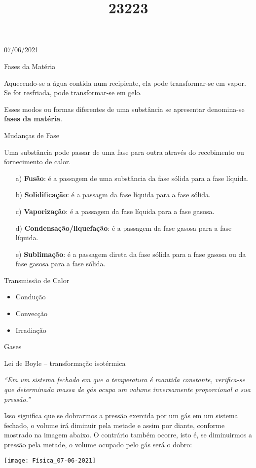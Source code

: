 \documentclass{SchoolBook}
\begin{document}
    \begin{day}{07/06/2021}
        \title{2}{Fases da Matéria}
        
        Aquecendo-se a água contida num recipiente, ela pode transformar-se em vapor. Se for resfriada, pode transformar-se em gelo.
        
        Esses modos ou formas diferentes de uma substância se apresentar denomina-se \textbf{fases da matéria}.
        
        \title{3}{Mudanças de Fase}
        
        Uma substância pode passar de uma fase para outra através do recebimento ou fornecimento de calor.
        
        \begin{enumerate}[nosep]
            \item[a)] \textbf{Fusão}: é a passagem de uma substância da fase sólida para a fase líquida.
            \item[b)] \textbf{Solidificação}: é a passagm da fase líquida para a fase sólida.
            \item[c)] \textbf{Vaporização}: é a passagem da fase líquida para a fase gasosa.
            \item[d)] \textbf{Condensação/liquefação}: é a passagem da fase gasosa para a fase líquida.
            \item[e)] \textbf{Sublimação}: é a passagem direta da fase sólida para a fase gasosa ou da fase gasosa para a fase sólida.
        \end{enumerate}
        
        \title{2}{Transmissão de Calor}
        
        \begin{itemize}[nosep]
            \item Condução
            \item Convecção
            \item Irradiação
        \end{itemize}
        
        \title{2}{Gases}
        
        \title{3}{Lei de Boyle -- transformação isotérmica}
        
	\begin{center}
        	\emph{“Em um sistema fechado em que a temperatura é mantida constante, verifica-se que determinada massa de gás ocupa um volume inversamente proporcional a sua pressão.”}
	\end{center}        

        Isso significa que se dobrarmos a pressão exercida por um gás em um sistema fechado, o volume irá diminuir pela metade e assim por diante, conforme mostrado na imagem abaixo. O contrário também ocorre, isto é, se diminuirmos a pressão pela metade, o volume ocupado pelo gás será o dobro:
        
        \vspace{12pt}
        \begin{center}
            \texttt{[image: Física\_07-06-2021]}
        \end{center}
    \end{day}
\end{document}
